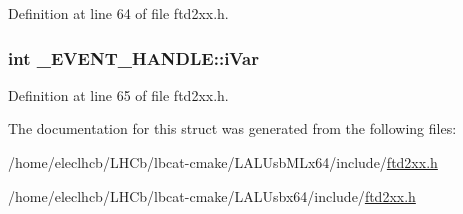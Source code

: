 Definition at line 64 of file ftd2xx.h.\hypertarget{struct__EVENT__HANDLE_aa96bc22ec0f4f46df8e3ad9f1bbb7baa}{
\subsubsection[{iVar}]{\setlength{\rightskip}{0pt plus 5cm}int {\bf \_\-EVENT\_\-HANDLE::iVar}}}
\label{struct__EVENT__HANDLE_aa96bc22ec0f4f46df8e3ad9f1bbb7baa}


Definition at line 65 of file ftd2xx.h.

The documentation for this struct was generated from the following files:\begin{DoxyCompactItemize}
\item 
/home/eleclhcb/LHCb/lbcat-\/cmake/LALUsbMLx64/include/\hyperlink{LALUsbMLx64_2include_2ftd2xx_8h}{ftd2xx.h}\item 
/home/eleclhcb/LHCb/lbcat-\/cmake/LALUsbx64/include/\hyperlink{LALUsbx64_2include_2ftd2xx_8h}{ftd2xx.h}\end{DoxyCompactItemize}
